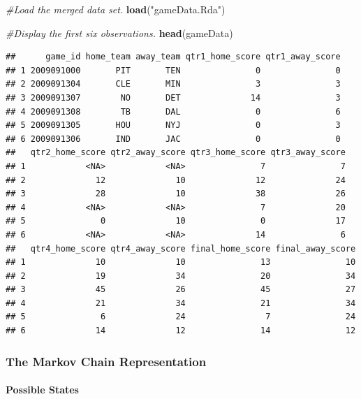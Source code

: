 \documentclass[
]{article}
\newenvironment{Shaded}{\begin{snugshade}}{\end{snugshade}}
\newcommand{\CommentTok}[1]{\textcolor[rgb]{0.56,0.35,0.01}{\textit{#1}}}
\newcommand{\KeywordTok}[1]{\textcolor[rgb]{0.13,0.29,0.53}{\textbf{#1}}}
\newcommand{\NormalTok}[1]{#1}
\newcommand{\StringTok}[1]{\textcolor[rgb]{0.31,0.60,0.02}{#1}}
\let\oldparagraph\paragraph
\renewcommand{\paragraph}[1]{\oldparagraph{#1}\mbox{}}
\begin{document}
\begin{Shaded}
\begin{Highlighting}[]
\CommentTok{#Load the merged data set.}
\KeywordTok{load}\NormalTok{(}\StringTok{"gameData.Rda"}\NormalTok{)}

\CommentTok{#Display the first six observations.}
\KeywordTok{head}\NormalTok{(gameData)}
\end{Highlighting}
\end{Shaded}

\begin{verbatim}
##      game_id home_team away_team qtr1_home_score qtr1_away_score
## 1 2009091000       PIT       TEN               0               0
## 2 2009091304       CLE       MIN               3               3
## 3 2009091307        NO       DET              14               3
## 4 2009091308        TB       DAL               0               6
## 5 2009091305       HOU       NYJ               0               3
## 6 2009091306       IND       JAC               0               0
##   qtr2_home_score qtr2_away_score qtr3_home_score qtr3_away_score
## 1            <NA>            <NA>               7               7
## 2              12              10              12              24
## 3              28              10              38              26
## 4            <NA>            <NA>               7              20
## 5               0              10               0              17
## 6            <NA>            <NA>              14               6
##   qtr4_home_score qtr4_away_score final_home_score final_away_score
## 1              10              10               13               10
## 2              19              34               20               34
## 3              45              26               45               27
## 4              21              34               21               34
## 5               6              24                7               24
## 6              14              12               14               12
\end{verbatim}

\hypertarget{the-markov-chain-representation}{%
\subsubsection{The Markov Chain
Representation}\label{the-markov-chain-representation}}

\hypertarget{possible-states}{%
\paragraph{Possible States}\label{possible-states}}
\end{document}
